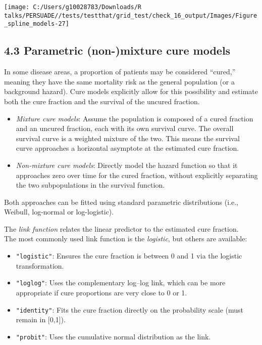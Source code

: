 \documentclass[
]{article}
\providecommand{\tightlist}{%
  \setlength{\itemsep}{0pt}\setlength{\parskip}{0pt}}
\begin{document}
\begin{flushleft}\texttt{[image: C:/Users/g10028783/Downloads/R talks/PERSUADE//tests/testthat/grid\_test/check\_16\_output/Images/Figure\_spline\_models-27]} \end{flushleft}

\clearpage

\subsection{4.3 Parametric (non-)mixture cure
models}\label{parametric-non-mixture-cure-models}

In some disease areas, a proportion of patients may be considered
``cured,'' meaning they have the same mortality risk as the general
population (or a background hazard). Cure models explicitly allow for
this possibility and estimate both the cure fraction and the survival of
the uncured fraction.

\begin{itemize}
\tightlist
\item
  \emph{Mixture cure models}: Assume the population is composed of a
  cured fraction and an uncured fraction, each with its own survival
  curve. The overall survival curve is a weighted mixture of the two.
  This means the survival curve approaches a horizontal asymptote at the
  estimated cure fraction.\\
\item
  \emph{Non-mixture cure models}: Directly model the hazard function so
  that it approaches zero over time for the cured fraction, without
  explicitly separating the two subpopulations in the survival function.
\end{itemize}

Both approaches can be fitted using standard parametric distributions
(i.e., Weibull, log-normal or log-logistic).

The \emph{link function} relates the linear predictor to the estimated
cure fraction.\\
The most commonly used link function is the \emph{logistic}, but others
are available:

\begin{itemize}
\tightlist
\item
  \texttt{"logistic"}: Ensures the cure fraction is between 0 and 1 via
  the logistic transformation.\\
\item
  \texttt{"loglog"}: Uses the complementary log--log link, which can be
  more appropriate if cure proportions are very close to 0 or 1.\\
\item
  \texttt{"identity"}: Fits the cure fraction directly on the
  probability scale (must remain in {[}0,1{]}).\\
\item
  \texttt{"probit"}: Uses the cumulative normal distribution as the
  link.
\end{itemize}
\end{document}
